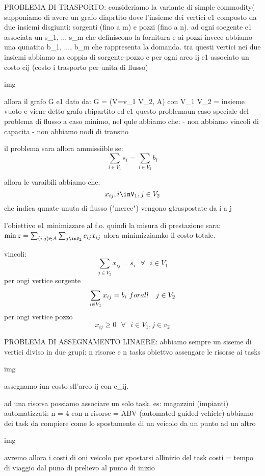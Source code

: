 PROBLEMA DI TRASPORTO:
consideriamo la variante di simple commodity( supponiamo di avere un grafo diaprtito dove l'insieme dei vertici e1 composto da due insiemi disgiunti: sorgenti (fino a m) e pozzi (fino a n). ad ogni soegente e1 associata un s_1, .., s_m  che definiscono la fornitura e ai pozzi invece abbiamo una qunatita b_1, ..., b_m che rappresenta la domanda. tra questi vertici nei due insiemi abbiamo na coppia di sorgente-pozzo e per ogni arco ij e1 associato un costo cij (costo i trasporto per unita di flusso)

img

allora il grafo G e1 dato da: G = (V=v_1 \cup V_2, A) con V_1 \cap V_2 = insieme vuoto e viene detto grafo rbipartito ed e1 questo problemaun caso speciale del problema di flusso a caso minimo, nel qule abbiamo che:
- non abbiamo vincoli di capacita
- non abbiamo nodi di transito

il problema sara allora ammissiible se:
$$\sum_{i\in V_1} s_i = \sum_{i\in V_2} b_i$$

allora le varaibili abbiamo che:
$$x_{ij}, i\inV_1, j\in V_2$$ che indica qunate unuta di flusso ("merce") vengono gtraspostate da i a j


l'obiettivo e1 minimizzare al f.o. quindi la misura di prestazione sara: $\min z = \sum_{(i,j)\in A}\sum_{j\inV_2} c_{ij}x_{ij}$ alora minimizziamko il costo totale.

vincoli:
$$\sum_{j\in V_2} x_{ij} = s_i\ \ \ \forall\ \ \ i\in V_1$$ per ongi vertice sorgente
$$\sum_{i\in V_1} x_{ij} = b_i\ \  \\forall\ \ \ j\in V_2$$ per ongi vertice pozzo
$$x_{ij} \geq 0\ \ \ \forall\ \ \ i\in V_1, j\in v_2$$



PROBLEMA DI ASSEGNAMENTO LINAERE:
abbiamo sempre un siseme di vertici diviso in due grupi: n risorse e n tasks
obiettvo assengare le risorse ai tasks

img

assegnamo iun costo sll'arco ij con c_{ij}.

ad una risorsa possiamo associare un solo task.
es: magazzini (impianti) automatizzati: n = 4 con n risorse = ABV (automated guided vehicle)
abbiamo dei task da compiere come lo spostamente di un veicolo da un punto ad un altro

img

avremo allora i costi di oni veicolo per spostarsi allinizio del task
costi = tempo di viaggio dal puno di prelievo al punto di inizio

